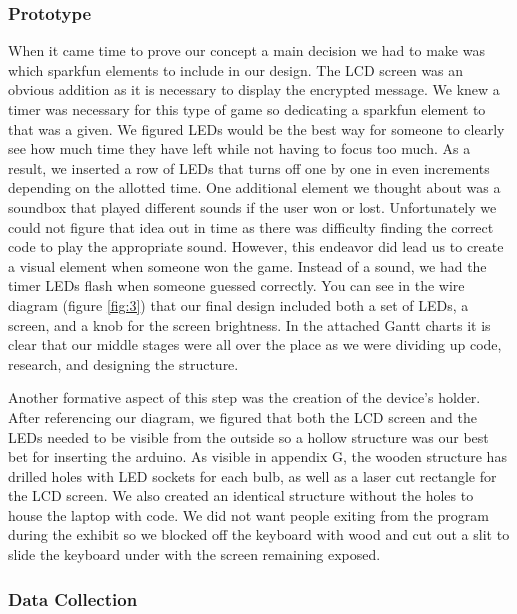 \documentclass[conference]{IEEEtran}
\begin{document}
\subsubsection{Prototype}

\par When it came time to prove our concept a main decision we had to make was which sparkfun elements to include in our design. The LCD screen was an obvious addition as it is necessary to display the encrypted message. We knew a timer was necessary for this type of game so dedicating a sparkfun element to that was a given. We figured LEDs would be the best way for someone to clearly see how much time they have left while not having to focus too much. As a result, we inserted a row of LEDs that turns off one by one in even increments depending on the allotted time. One additional element we thought about was a soundbox that played different sounds if the user won or lost. Unfortunately we could not figure that idea out in time as there was difficulty finding the correct code to play the appropriate sound. However, this endeavor did lead us to create a visual element when someone won the game. Instead of a sound, we had the timer LEDs flash when someone guessed correctly. You can see in the wire diagram (figure \ref{fig:3}) that our final design included both a set of LEDs, a screen, and a knob for the screen brightness. In the attached Gantt charts it is clear that our middle stages were all over the place as we were dividing up code, research, and designing the structure. 
\par Another formative aspect of this step was the creation of the device’s holder. After referencing our diagram, we figured that both the LCD screen and the LEDs needed to be visible from the outside so a hollow structure was our best bet for inserting the arduino. As visible in appendix G, the wooden structure has drilled holes with LED sockets for each bulb, as well as a laser cut rectangle for the LCD screen. We also created an identical structure without the holes to house the laptop with code. We did not want people exiting from the program during the exhibit so we blocked off the keyboard with wood and cut out a slit to slide the keyboard under with the screen remaining exposed.  

\subsubsection{Data Collection}
\end{document}
